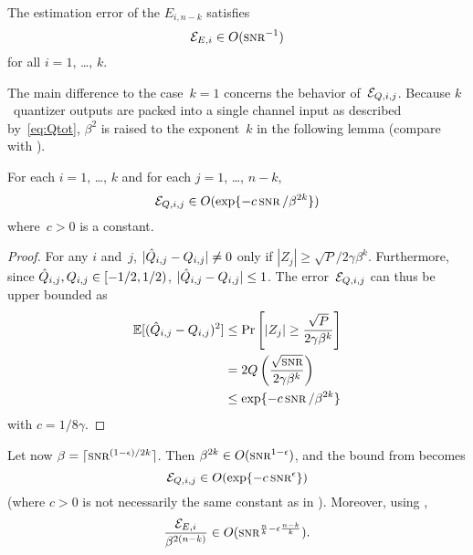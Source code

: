 \begin{lemma}
  \label{lem:Eedecayk}
  The estimation error of the $E_{i,n-k}$ satisfies
  \begin{equation*}
    \Err_{E,i} \in O(\snr^{-1})
  \end{equation*}
  for all $i = 1$, \dots, $k$. 
\end{lemma}

The main difference to the case~$k=1$ concerns the behavior of~${\mathcal{E}}_{Q,i,j}$.
Because $k$~quantizer outputs are packed into a single channel input as
described by~\eqref{eq:Qtot}, $\beta^2$ is raised to the exponent~$k$ in the
following lemma (compare with ).

\begin{lemma}
  \label{lem:eqboundk}
  For each $i = 1$, \dots, $k$ and for each $j = 1$, \dots, $n-k$,
  \begin{equation*}
    \Err_{Q,i,j} \in O(\exp\{-c \snr/\beta^{2k} \})
  \end{equation*}
  where~$c > 0$ is a constant.
\end{lemma}

\begin{proof}
  For any $i$ and~$j$, $| \hat{Q}_{i,j} - Q_{i,j}| \ne 0$ only if $|Z_j| \ge
  \sqrt{P} / 2 \gamma \beta^k$. Furthermore, since $\hat{Q}_{i,j}, Q_{i,j} \in
  [-1/2, 1/2)$, $|\hat{Q}_{i,j} - Q_{i,j}| \le 1$. The error~${\mathcal{E}}_{Q,i,j}$ can thus
  be upper bounded as
  \begin{align*}
    \E[(\Qh_{i,j} - Q_{i,j})^2] &\le \Pr\left[|Z_j| \ge \frac{\sqrt{P}}{2 \gamma
    \beta^k} \right] \\
    &= 2 Q\left( \frac{\sqrt{\snr}}{2\gamma\beta^k} \right) \\
    &\le \exp\{-c \snr / \beta^{2k} \}
  \end{align*}
  with $c = 1/8\gamma$.
\end{proof}


Let now $\beta = \lceil \snr^{(1-\e)/2k} \rceil$. Then $\beta^{2k} \in
O(\snr^{1-\e})$, and the bound from  becomes
\begin{equation}
  \label{eq:qboundkepsilon}
  \Err_{Q,i,j} \in O(\exp\{-c \snr^\e\})
\end{equation}
(where $c > 0$ is not necessarily the same constant as in ).
Moreover, using ,
\begin{equation}
  \label{eq:Eeboundkepsilon}
  \frac{\Err_{E,i}}{\beta^{2(n-k)}} \in O(\snr^{\frac{n}{k} - \e
  \frac{n-k}{k}}).
\end{equation}

